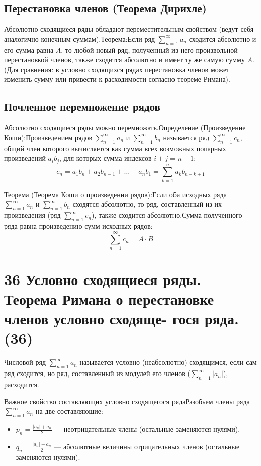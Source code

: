 \documentclass[14pt]{extreport}
\begin{document}
    \section{Перестановка членов (Теорема Дирихле)}
    Абсолютно сходящиеся ряды обладают переместительным свойством (ведут себя аналогично конечным суммам).Теорема:Если ряд $\sum_{n=1}^{\infty} a_n$ сходится абсолютно и его сумма равна $A$, то любой новый ряд, полученный из него произвольной перестановкой членов, также сходится абсолютно и имеет ту же самую сумму $A$.(Для сравнения: в условно сходящихся рядах перестановка членов может изменить сумму или привести к расходимости согласно теореме Римана).

    \section{Почленное перемножение рядов}
    Абсолютно сходящиеся ряды можно перемножать.Определение (Произведение Коши):Произведением рядов $\sum_{n=1}^{\infty} a_n$ и $\sum_{n=1}^{\infty} b_n$ называется ряд $\sum_{n=1}^{\infty} c_n$, общий член которого вычисляется как сумма всех возможных попарных произведений $a_i b_j$, для которых сумма индексов $i+j = n+1$:$$c_n = a_1 b_n + a_2 b_{n-1} + \dots + a_n b_1 = \sum_{k=1}^n a_k b_{n-k+1}$$

    \begin{theorem}
        Теорема (Теорема Коши о произведении рядов):Если оба исходных ряда $\sum_{n=1}^{\infty} a_n$ и $\sum_{n=1}^{\infty} b_n$ сходятся абсолютно, то ряд, составленный из их произведения (ряд $\sum_{n=1}^{\infty} c_n$), также сходится абсолютно.Сумма полученного ряда равна произведению сумм исходных рядов:$$\sum_{n=1}^{\infty} c_n = A \cdot B$$
    \end{theorem}

    \chapter{36 Условно сходящиеся ряды. Теорема Римана о перестановке членов условно сходяще-
гося ряда. (36)}

    \begin{definition}
        Числовой ряд $\sum_{n=1}^{\infty} a_n$ называется условно (неабсолютно) сходящимся, если сам ряд сходится, но ряд, составленный из модулей его членов ($\sum_{n=1}^{\infty} |a_n|$), расходится.
    \end{definition}

    Важное свойство составляющих условно сходящегося рядаРазобьем члены ряда $\sum_{n=1}^{\infty} a_n$ на две составляющие:
    \begin{itemize}
        \item $p_n = \frac{|a_n| + a_n}{2}$ — неотрицательные члены (остальные заменяются нулями).
        \item $q_n = \frac{|a_n| - a_n}{2}$ — абсолютные величины отрицательных членов (остальные заменяются нулями).
    \end{itemize}
\end{document}
